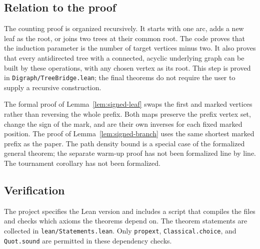 \documentclass[11pt]{article}
\numberwithin{equation}{section}
\theoremstyle{definition}
\begin{document}
\subsection{Relation to the proof}

The counting proof is organized recursively.  It starts with one arc,
adds a new leaf as the root, or joins two trees at their common root.
The code proves that the induction parameter is the number of target
vertices minus two.  It also proves that every antidirected tree
with a connected, acyclic underlying graph can be built by these
operations, with any chosen vertex as its root.  This step is proved
in \texttt{Digraph/TreeBridge.lean}; the final theorems do not require
the user to supply a recursive construction.

The formal proof of Lemma~\ref{lem:signed-leaf} swaps the first and
marked vertices rather than reversing the whole prefix.  Both maps
preserve the prefix vertex set, change the sign of the mark, and are
their own inverses for each fixed marked position.  The proof of
Lemma~\ref{lem:signed-branch} uses the same shortest marked prefix
as the paper.  The path density bound is a special case of the
formalized general theorem; the separate warm-up proof has not been
formalized line by line.  The tournament corollary has not been formalized.

\subsection{Verification}

The project specifies the Lean version and includes a script that
compiles the files and checks which axioms the theorems depend on.
The theorem statements are collected in \texttt{lean/Statements.lean}.
Only \texttt{propext}, \texttt{Classical.choice}, and
\texttt{Quot.sound} are permitted in these dependency checks.
\end{document}
